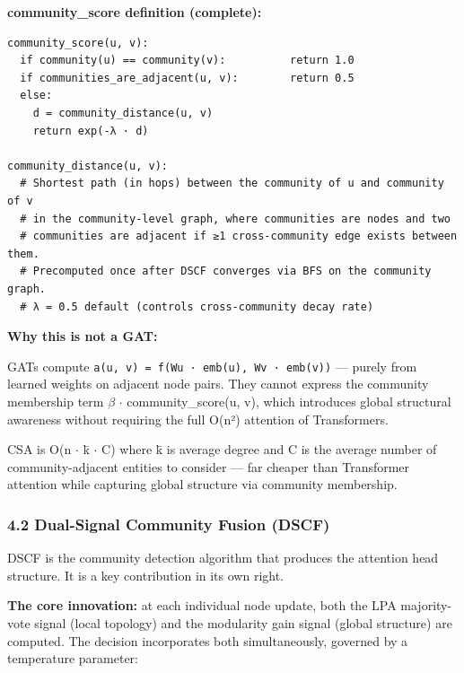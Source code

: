 \documentclass[10pt,journal,compsoc]{IEEEtran}
\begin{document}
\textbf{community\_score definition (complete):}

\begin{lstlisting}
community_score(u, v):
  if community(u) == community(v):          return 1.0
  if communities_are_adjacent(u, v):        return 0.5
  else:
    d = community_distance(u, v)
    return exp(-λ · d)

community_distance(u, v):
  # Shortest path (in hops) between the community of u and community of v
  # in the community-level graph, where communities are nodes and two
  # communities are adjacent if ≥1 cross-community edge exists between them.
  # Precomputed once after DSCF converges via BFS on the community graph.
  # λ = 0.5 default (controls cross-community decay rate)
\end{lstlisting}

\textbf{Why this is not a GAT:}

GATs compute \texttt{a(u, v) = f(Wu · emb(u), Wv · emb(v))} — purely from learned
weights on adjacent node pairs. They cannot express the community membership
term $\beta$ $\cdot$ community\_score(u, v), which introduces global structural awareness
without requiring the full O(n²) attention of Transf\-ormers.

CSA is O(n $\cdot$ k̄ $\cdot$ C) where k̄ is average degree and C is the average number
of community-adjacent entities to consider — far cheaper than Transformer
attention while capturing global structure via community membership.

\subsubsection{4.2 Dual-Signal Community Fusion (DSCF)}

DSCF is the community detection algorithm that produces the attention head
structure. It is a key contr\-ibution in its own right.

\textbf{The core innovation:} at each individual node update, both the LPA
majority-vote signal (local topology) and the modularity gain signal (global
structure) are computed. The decision incor\-porates both simul\-taneously,
governed by a temperature parameter:
\end{document}
